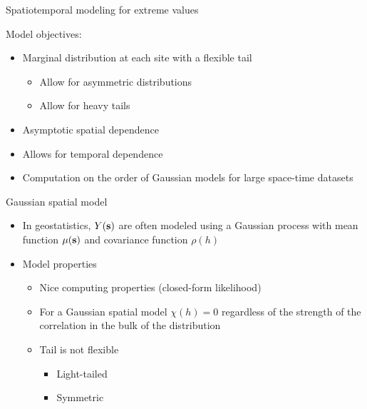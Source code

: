 \documentclass{beamer}
\begin{document}
\begin{frame}{Spatiotemporal modeling for extreme values}
\begin{adjustwidth}{1em}{0em}
  Model objectives: \vspace{1em}
  \begin{itemize} \setlength{\itemsep}{1em} \setlength{\itemindent}{1em}
    \item Marginal distribution at each site with a flexible tail
    \begin{itemize}
      \item Allow for asymmetric distributions
      \item Allow for heavy tails
    \end{itemize}
    \item Asymptotic spatial dependence
    \item Allows for temporal dependence
    \item Computation on the order of Gaussian models for large space-time datasets
  \end{itemize}
\end{adjustwidth}
\end{frame}

\begin{frame}{Gaussian spatial model}
  \begin{itemize} \setlength{\itemsep}{1em}
    \item In geostatistics, $Y(\mbox{\bf s})$ are often modeled using a Gaussian process with mean function $\mu(\mbox{\bf s})$ and covariance function $\rho(h)$
    \item Model properties
    \begin{itemize}
      \item Nice computing properties (closed-form likelihood)
      \item For a Gaussian spatial model $\chi(h) = 0$ regardless of the strength of the correlation in the bulk of the distribution
      \item Tail is not flexible
      \begin{itemize}
        \item Light-tailed
        \item Symmetric
      \end{itemize}
    \end{itemize}
  \end{itemize}
\end{frame}
\end{document}
